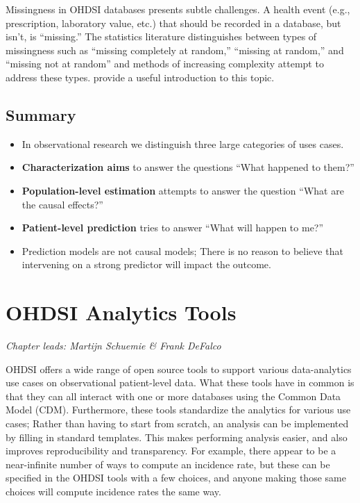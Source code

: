 \documentclass[11pt]{book}
\theoremstyle{definition}
\theoremstyle{definition}
\theoremstyle{definition}
\theoremstyle{remark}
\let\BeginKnitrBlock\begin \let\EndKnitrBlock\end
\begin{document}
Missingness in OHDSI databases presents subtle challenges. A health event (e.g., prescription, laboratory value, etc.) that should be recorded in a database, but isn't, is ``missing.'' The statistics literature distinguishes between types of missingness such as ``missing completely at random,'' ``missing at random,'' and ``missing not at random'' and methods of increasing complexity attempt to address these types. \citet{perkins2017principled} provide a useful introduction to this topic.

\hypertarget{summary-4}{%
\section{Summary}\label{summary-4}}

\BeginKnitrBlock{rmdsummary}
\begin{itemize}
\item
  In observational research we distinguish three large categories of uses cases.
\item
  \textbf{Characterization aims} to answer the questions ``What happened to them?''
\item
  \textbf{Population-level estimation} attempts to answer the question ``What are the causal effects?''
\item
  \textbf{Patient-level prediction} tries to answer ``What will happen to me?''
\item
  Prediction models are not causal models; There is no reason to believe that intervening on a strong predictor will impact the outcome.
\end{itemize}
\EndKnitrBlock{rmdsummary}

\hypertarget{OhdsiAnalyticsTools}{%
\chapter{OHDSI Analytics Tools}\label{OhdsiAnalyticsTools}}

\emph{Chapter leads: Martijn Schuemie \& Frank DeFalco}

OHDSI offers a wide range of open source tools to support various data-analytics use cases on observational patient-level data. What these tools have in common is that they can all interact with one or more databases using the Common Data Model (CDM). Furthermore, these tools standardize the analytics for various use cases; Rather than having to start from scratch, an analysis can be implemented by filling in standard templates. This makes performing analysis easier, and also improves reproducibility and transparency. For example, there appear to be a near-infinite number of ways to compute an incidence rate, but these can be specified in the OHDSI tools with a few choices, and anyone making those same choices will compute incidence rates the same way.
\end{document}
